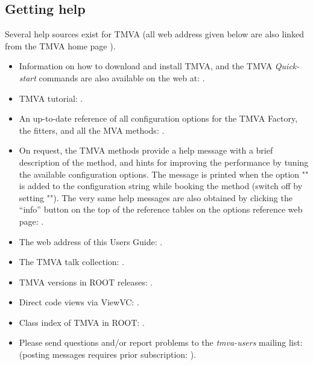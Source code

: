 \subsection{Getting help}

Several help sources exist for TMVA (all web address given below are also linked from the 
TMVA home page ).
\begin{itemize}

\item Information on how to download and install TMVA, and the TMVA {\em Quick-start} commands 
      are also available on the web at: .

\item TMVA tutorial: .

\item An up-to-date reference of all configuration options for the TMVA Factory, the fitters,
      and all the MVA methods: .

\item On request, the TMVA methods provide a help message with a brief description of the 
      method, and hints for improving the performance by tuning the available configuration 
      options. The message is printed when the option "" is added to the configuration 
      string while booking the method (switch off by setting ""). The very same help
      messages are also obtained by clicking the ``info'' button on the top of the reference
      tables on the options reference web page: .      

\item The web address of this Users Guide:
      .

\item The TMVA talk collection: .

\item TMVA versions in ROOT releases: 
      .

\item Direct code views via ViewVC: .

\item Class index of TMVA in ROOT: .

\item Please send questions and/or report problems to the {\em tmva-users} mailing list: \\
       (posting 
      messages requires prior subscription: 
      ).

\end{itemize}


